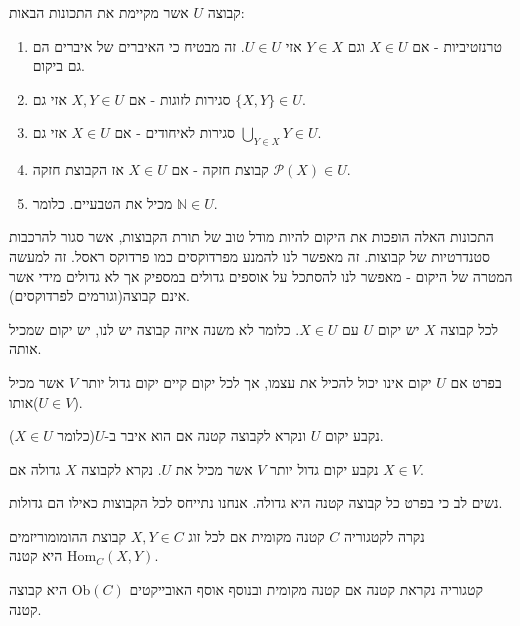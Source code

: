 \documentclass{tstextbook}
\begin{document}
\begin{definition}[יקום]
קבוצה \(U\) אשר מקיימת את התכונות הבאות:

  \begin{enumerate}
    \item טרנזטיביות - אם \(X \in U\) וגם \(Y \in X\) אזי \(U \in U\). זה מבטיח כי האיברים של איברים הם גם ביקום. 


    \item סגירות לזוגות - אם \(X,Y\in U\) אזי גם \(\{ X,Y \}\in U\). 


    \item סגירות לאיחודים - אם \(X \in U\) אזי גם \(\bigcup_{Y \in X}Y \in U\).  


    \item קבוצת חזקה - אם \(X \in U\) אז הקבוצת חזקה \(\mathcal{P}(X)\in U\). 


    \item מכיל את הטבעיים. כלומר \(\mathbb{N} \in U\). 


  \end{enumerate}
\end{definition}
\begin{remark}
התכונות האלה הופכות את היקום להיות מודל טוב של תורת הקבוצות, אשר סגור להרכבות סטנדרטיות של קבוצות. זה מאפשר לנו להמנע מפרדוקסים כמו פרדוקס ראסל. זה למעשה המטרה של היקום - מאפשר לנו להסתכל על אוספים גדולים במספיק אך לא גדולים מידי אשר אינם קבוצה(וגורמים לפרדוקסים).

\end{remark}
\begin{definition}
לכל קבוצה \(X\) יש יקום \(U\) עם \(X \in U\). כלומר לא משנה איזה קבוצה יש לנו, יש יקום שמכיל אותה.

\end{definition}
\begin{corollary}
בפרט אם \(U\) יקום אינו יכול להכיל את עצמו, אך לכל יקום קיים יקום גדול יותר \(V\) אשר מכיל אותו(\(U \in V\)).

\end{corollary}
\begin{definition}
נקבע יקום \(U\) ונקרא לקבוצה קטנה אם הוא איבר ב-\(U\)(כלומר \(X \in U\)).

\end{definition}
\begin{definition}
נקבע יקום גדול יותר \(V\) אשר מכיל את \(U\). נקרא לקבוצה \(X\) גדולה אם \(X \in V\).

\end{definition}
\begin{remark}
נשים לב כי בפרט כל קבוצה קטנה היא גדולה. אנחנו נתייחס לכל הקבוצות כאילו הם גדולות. 

\end{remark}
\begin{definition}
נקרה לקטגוריה \(C\) קטנה מקומית אם לכל זוג \(X,Y \in C\) קבוצת ההומומוריזמים \(\mathrm{Hom}_{C}(X,Y)\) היא קטנה.

\end{definition}
\begin{definition}
קטגוריה נקראת קטנה אם קטנה מקומית ובנוסף אוסף האובייקטים \(\mathrm{Ob}(C)\) היא קבוצה קטנה.

\end{definition}
\end{document}
